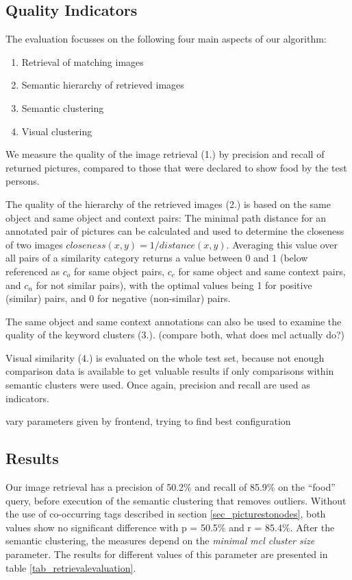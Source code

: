 \subsection{Quality Indicators}
The evaluation focusses on the following four main aspects of our algorithm:
\begin{enumerate}
\item Retrieval of matching images
\item Semantic hierarchy of retrieved images
\item Semantic clustering
\item Visual clustering
\end{enumerate}

We measure the quality of the image retrieval (1.) by precision and recall of returned pictures, compared to those that were declared to show food by the test persons.  

The quality of the hierarchy of the retrieved images (2.) is based on the same object and same object and context pairs: The  minimal path distance for an annotated pair of pictures can be calculated and used to determine the closeness of two images $closeness(x,y) = 1/distance(x,y)$. Averaging this value over all pairs of a similarity category returns a value between 0 and 1 (below referenced as $c_o$ for same object pairs, $c_c$ for same object and same context pairs, and $c_n$ for not similar pairs), with the optimal values being 1 for positive (similar) pairs, and 0 for negative (non-similar) pairs.

The same object and same context annotations can also be used to examine the quality of the keyword clusters (3.).  (compare both, what does mcl actually do?)

Visual similarity (4.) is evaluated on the whole test set, because not enough comparison data is available to get valuable results if only comparisons within semantic clusters were used. Once again, precision and recall are used as indicators.

vary parameters given by frontend, trying to find best configuration

\subsection{Results}
\label{sec_results}
Our image retrieval has a precision of 50.2\% and recall of 85.9\% on the ``food'' query, before execution of the semantic clustering that removes outliers. Without the use of co-occurring tags described in section \ref{sec_picturestonodes}, both values show no significant difference with p = 50.5\% and r = 85.4\%.
After the semantic clustering, the measures depend on the \emph{minimal mcl cluster size} parameter. The results for different values of this parameter are presented in table \ref{tab_retrievalevaluation}.\\

